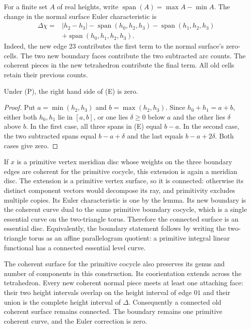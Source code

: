 For a finite set $A$ of real heights, write
$\operatorname{span}(A)=\max A-\min A$.  The change in the normal
surface Euler characteristic is
\begin{align*}
 \Delta\chi={}& |h_2-h_3|
 -\operatorname{span}(h_0,h_2,h_3)
 -\operatorname{span}(h_1,h_2,h_3)\\
 &+\operatorname{span}(h_0,h_1,h_2,h_3).                \tag{E}
\end{align*}
Indeed, the new edge $23$ contributes the first term to the normal
surface's zero-cells.  The two new boundary faces contribute the two
subtracted arc counts.  The coherent pieces in the new tetrahedron
contribute the final term.  All old cells retain their previous counts.

\begin{lemma}
Under (P), the right hand side of (E) is zero.
\end{lemma}

\begin{proof}
Put $a=\min(h_2,h_3)$ and $b=\max(h_2,h_3)$.  Since
$h_0+h_1=a+b$, either both $h_0,h_1$ lie in $[a,b]$, or one lies
$\delta\geq0$ below $a$ and the other lies $\delta$ above $b$.
In the first case, all three spans in (E) equal $b-a$.
In the second case, the two subtracted spans equal $b-a+\delta$
and the last equals $b-a+2\delta$.  Both cases give zero.
\end{proof}

If $x$ is a primitive vertex meridian disc whose weights on the three
boundary edges are coherent for the primitive cocycle, this extension
is again a meridian disc.  The extension is a primitive vertex surface,
so it is connected: otherwise its distinct component vectors would
decompose its ray, and primitivity excludes multiple copies.  Its Euler
characteristic is one by the lemma.  Its new boundary is the coherent
curve dual to the same primitive boundary cocycle, which is a single
essential curve on the two-triangle torus.  Therefore the connected
surface is an essential disc.  Equivalently, the boundary statement
follows by writing the two-triangle torus as an affine parallelogram
quotient: a primitive integral linear functional has a connected
essential level curve.

The coherent surface for the primitive cocycle also preserves its genus
and number of components in this construction.  Its coorientation
extends across the tetrahedron.  Every new coherent normal piece meets
at least one attaching face: their two height intervals overlap on the
height interval of edge $01$ and their union is the complete height
interval of $\Delta$.  Consequently a connected old coherent surface
remains connected.  The boundary remains one primitive coherent curve,
and the Euler correction is zero.

